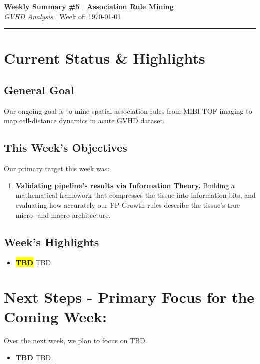\documentclass[10pt, a4paper]{article}
\begin{document}
\begin{center}
    {\Large \textbf{Weekly Summary \#5 $\vert$ Association Rule Mining}} \\[0.5em]
    \textit{GVHD Analysis} $\vert$ Week of: \today
\end{center}
\vspace{0.2cm}
\hrule
\vspace{0.5cm}

\section{Current Status \& Highlights}

\subsection*{General Goal}
Our ongoing goal is to mine spatial association rules from MIBI-TOF imaging to map cell-distance dynamics in acute GVHD \cite{ref_gvhd} dataset. 


\subsection*{This Week's Objectives}
Our primary target this week was:
\begin{enumerate}
    \item \textbf{Validating pipeline's results via Information Theory.} Building a mathematical framework that compresses the tissue into information bits, and evaluating how accurately our FP-Growth rules describe the tissue's true micro- and macro-architecture.

    
\end{enumerate}


\subsection*{Week's Highlights}

\begin{itemize}
\item \textbf{\hl{TBD}} TBD
\end{itemize}


\section{Next Steps - Primary Focus for the Coming Week:}
Over the next week, we plan to focus on TBD.
\begin{itemize}
    \item \textbf{TBD} TBD.

\end{itemize}
\end{document}

